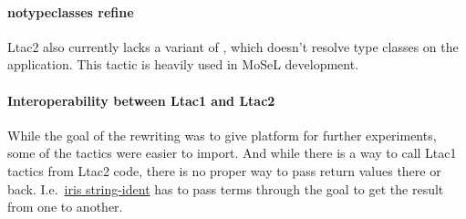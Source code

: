 \paragraph{notypeclasses refine}

Ltac2 also currently lacks a variant of , which doesn't resolve type classes on the application.
This tactic is heavily used in MoSeL development.

\paragraph{Interoperability between Ltac1 and Ltac2}

While the goal of the rewriting was to give platform for further experiments, some of the tactics were easier to import.
And while there is a way to call Ltac1 tactics from Ltac2 code, there is no proper way to pass return values there or back.
I.e.\ \href{https://gitlab.mpi-sws.org/iris/string-ident/}{iris string-ident} has to pass terms through the goal to get the result from one to another.

